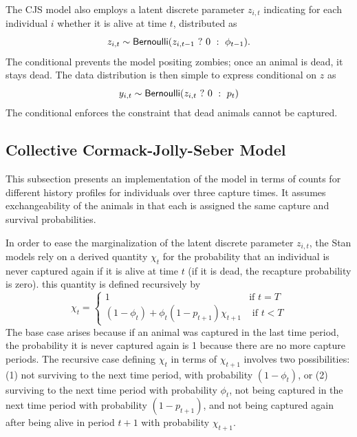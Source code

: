 The CJS model also employs a latent discrete parameter $z_{i,t}$
indicating for each individual $i$ whether it is alive at time $t$,
distributed as
%
\[
z_{i,t} \sim \distro{Bernoulli}(\ternary{z_{i,t-1}}{0}{\phi_{t-1}}).
\]
%
The conditional prevents the model positing zombies; once an animal is
dead, it stays dead.  The data distribution is then simple to express
conditional on $z$ as
%
\[
y_{i,t} \sim \distro{Bernoulli}(\ternary{z_{i,t}}{0}{p_t})
\]
%
The conditional enforces the constraint that dead animals cannot be captured.


\subsection{Collective Cormack-Jolly-Seber Model}

This subsection presents an implementation of the model in terms of
counts for different history profiles for individuals over three
capture times. It assumes exchangeability of the animals in that each
is assigned the same capture and survival probabilities.

In order to ease the marginalization of the latent discrete parameter
$z_{i,t}$, the Stan models rely on a derived quantity $\chi_t$ for
the probability that an individual is never captured again if it is
alive at time $t$ (if it is dead, the recapture probability is zero).
this quantity is defined recursively by
\[
\chi_t 
= 
\begin{cases}
1 
& \mbox{if } t = T
\\[3pt]
(1 - \phi_t) + \phi_t (1 - p_{t+1}) \chi_{t+1}
& \mbox{ if } t < T
\end{cases}
\]
%
The base case arises because if an animal was captured in the last
time period, the probability it is never captured again is 1 because
there are no more capture periods.  The recursive case defining
$\chi_{t}$ in terms of $\chi_{t+1}$ involves two possibilities: (1)
not surviving to the next time period, with probability $(1 -
\phi_t)$, or (2) surviving to the next time period with probability
$\phi_t$, not being captured in the next time period with probability
$(1 - p_{t+1})$, and not being captured again after being alive in
period $t+1$ with probability $\chi_{t+1}$. 

